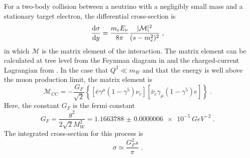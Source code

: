 For a two-body collision between a neutrino with a negligibly small mass and a stationary target electron, the differential cross-section is
\begin{equation}
    \frac{\mathrm{d} \sigma}{\mathrm{d} y} = \frac{m_e E_\nu}{8\pi}\frac{|\mathcal{M}|^2}{(s-m_e^2)^2}\;,
\end{equation}
in which $\mathcal{M}$ is the matrix element of the interaction. The matrix element can be calculated at tree level from the Feynman diagram in  and the charged-current Lagrangian from . In the case that $Q^2 \ll m_W$ and that the energy is well above the muon production limit, the matrix element is
\begin{equation}
    \mathcal{M}_{CC} = -\frac{G_F}{\sqrt{2}}\left\{ [\bar{e}\gamma^\mu(1-\gamma^5)\nu_e][\bar{\nu}_e\gamma_\mu(1-\gamma^5)e] \right\}\;.
\end{equation}
Here, the constant $G_F$ is the fermi constant\cite{pdg}
\begin{equation}
    G_F = \frac{g^2}{2\sqrt{2}M_W^2} = \SI{1.1663788(6)e-5}{GeV^{-2}}\;.
\end{equation}
The integrated cross-section for this process is
\begin{equation}
    \sigma \simeq \frac{G^2_F s}{\pi}\;.
\end{equation}

